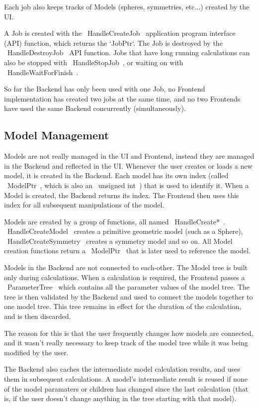 \documentclass[12pt]{article}
\begin{document}
Each job also keeps tracks of Models (spheres, symmetries, etc...) created by the UI. 

A Job is created with the ~HandleCreateJob~ application program interface (API) function, which returns the `JobPtr`. The Job is destroyed by the ~HandleDestroyJob~ API function. Jobs that have long running calculations can also be stopped with ~HandleStopJob~, or waiting on with ~HandleWaitForFinish~.

So far the Backend has only been used with one Job, no Frontend implementation has created two jobs at the same time, and no two Frontends have used the same Backend concurrently (simultaneously).

\subsection{Model Management}
Models are not really managed in the UI and Frontend, instead they are managed in the Backend and reflected in the UI. Whenever the user creates or loads a new model, it is created in the Backend. Each model has its own index (called ~ModelPtr~, which is also an ~unsigned int~) that is used to identify it. When a Model is created, the Backend returns its index. The Frontend then uses this index for all subsequent manipulations of the model.

Models are created by a group of functions, all named ~HandleCreate*~. ~HandleCreateModel~ creates a primitive geometric model (such as a Sphere), ~HandleCreateSymmetry~ creates a symmetry model and so on. All Model creation functions return a ~ModelPtr~ that is later used to reference the model.

Models in the Backend are not connected to each-other. The Model tree is built only during calculations. When a calculation is required, the Frontend passes a ~ParameterTree~ which contains all the parameter values of the model tree. The tree is then validated by the Backend and used to connect the models together to one model tree. This tree remains in effect for the duration of the calculation, and is then discarded.

The reason for this is that the user frequently changes how models are connected, and it wasn't really necessary to keep track of the model tree while it was being modified by the user.

The Backend also caches the intermediate model calculation results, and uses them in subsequent calculations. A model's intermediate result is reused if none of the model paramaters or children has changed since the last calculation (that is, if the user doesn't change anything in the tree starting with that model).
\end{document}
